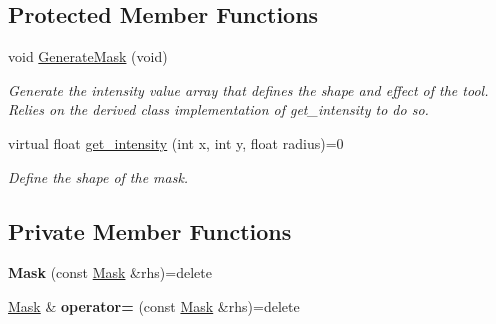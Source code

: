\subsection*{Protected Member Functions}
\begin{DoxyCompactItemize}
\item 
void \hyperlink{classimage__tools_1_1Mask_acbb15ffd3c486510b556d70bdc4a7740}{Generate\+Mask} (void)\hypertarget{classimage__tools_1_1Mask_acbb15ffd3c486510b556d70bdc4a7740}{}\label{classimage__tools_1_1Mask_acbb15ffd3c486510b556d70bdc4a7740}

\begin{DoxyCompactList}\small\item\em Generate the intensity value array that defines the shape and effect of the tool. Relies on the derived class implementation of get\+\_\+intensity to do so. \end{DoxyCompactList}\item 
virtual float \hyperlink{classimage__tools_1_1Mask_a72f63a05779159c4f5e2bfea21160c8a}{get\+\_\+intensity} (int x, int y, float radius)=0
\begin{DoxyCompactList}\small\item\em Define the shape of the mask. \end{DoxyCompactList}\end{DoxyCompactItemize}
\subsection*{Private Member Functions}
\begin{DoxyCompactItemize}
\item 
{\bfseries Mask} (const \hyperlink{classimage__tools_1_1Mask}{Mask} \&rhs)=delete\hypertarget{classimage__tools_1_1Mask_ae42a9089c82cdf624560a0201e3fa138}{}\label{classimage__tools_1_1Mask_ae42a9089c82cdf624560a0201e3fa138}

\item 
\hyperlink{classimage__tools_1_1Mask}{Mask} \& {\bfseries operator=} (const \hyperlink{classimage__tools_1_1Mask}{Mask} \&rhs)=delete\hypertarget{classimage__tools_1_1Mask_a4d312e1eeee6d449df299e1413cd7e4e}{}\label{classimage__tools_1_1Mask_a4d312e1eeee6d449df299e1413cd7e4e}

\end{DoxyCompactItemize}
